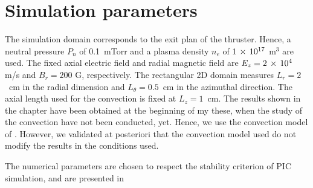 
\section{Simulation parameters}
  \label{sec-params}
  
  The simulation domain corresponds to the exit plan of the thruster.
  Hence, a neutral pressure $P_n$ of 0.1~mTorr and a plasma density $n_e$ of ${1}\,\times\,10^{17}$ m$^{3}$ are used.
  The fixed axial electric field and radial magnetic field are $E_z={2}\,\times\,10^{4}$ m/s and $B_r=200$ G, respectively.
  The rectangular \ac{2D} domain measures $L_r=2$~cm in the radial dimension and $L_{\theta}=0.5$~cm in the azimuthal direction.
  The axial length used for the convection is fixed at $L_z=1$~cm.
  The results shown in the chapter have been obtained at the beginning of my these, when the study of the convection have not been conducted, yet.
  Hence, we use the convection model of \citet{lafleur2016a}.
  However, we validated at posteriori that the convection model used do not modify the results in the conditions used.
  
  The numerical parameters are chosen to respect the stability criterion of \ac{PIC} simulation, and are presented in 
  
